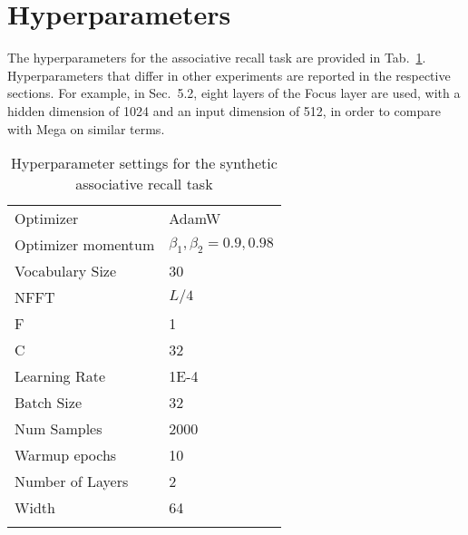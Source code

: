\documentclass[11pt]{article}
\begin{document}
\newpage


\newpage
\appendix
\section{Hyperparameters}
The hyperparameters for the associative recall task are provided in Tab.~\ref{tab:hyperparameters}. Hyperparameters that differ in other experiments are reported in the respective sections. For example, in Sec.~5.2, eight layers of the Focus layer are used, with a hidden dimension of 1024 and an input dimension of 512, in order to compare with Mega on similar terms. 
\label{sec:appendix}
\begin{table}[h]
\caption{Hyperparameter settings for the synthetic associative recall task}
\begin{tabular}{l l}
\toprule
Optimizer & AdamW\\
Optimizer momentum & $\beta_1,\beta_2 = 0.9,0.98$\\
Vocabulary Size & 30\\
NFFT & $L/4$\\
F & 1\\
C & 32 \\
Learning Rate & 1E-4\\
Batch Size & 32\\
Num Samples& 2000\\
Warmup epochs& 10\\
Number of Layers& 2\\
Width& 64\\
\bottomrule
\label{tab:hyperparameters}
\end{tabular}
\end{table}
\smallskip
\end{document}
